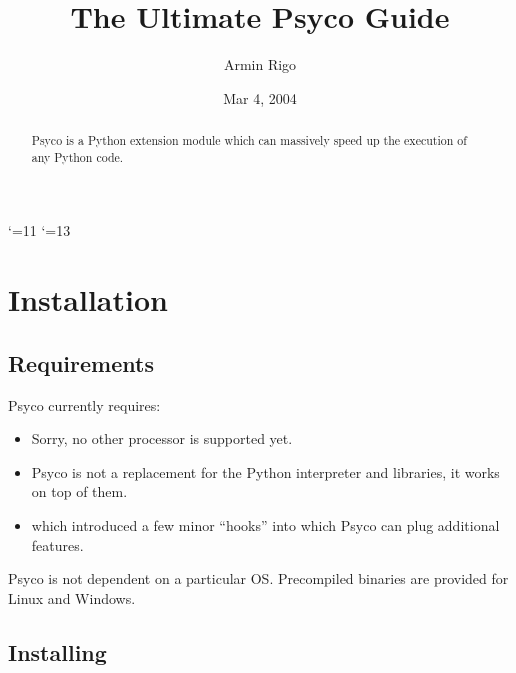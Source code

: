 \documentclass{manual}
\title{The Ultimate Psyco Guide}
\author{Armin Rigo}
\date{Mar 4, 2004}
\begin{document}
\catcode`\@=11
\renewcommand{\py@reset}{}
\catcode`\@=13

\maketitle


\begin{abstract}

\noindent
Psyco is a Python extension module which can massively speed up the execution of any Python code.


\end{abstract}

\tableofcontents


\chapter{Installation}

\section{Requirements}\label{req}

Psyco currently requires:

\begin{itemize}
  
\item {}  Sorry, no other processor is supported yet.
  
\item {}  Psyco is not a replacement for the Python interpreter and libraries, it works on top of them.
  
\item {} which introduced a few minor ``hooks'' into which Psyco can plug additional features.
  
\end{itemize}

Psyco is not dependent on a particular OS.  Precompiled binaries are provided for Linux and Windows.


\section{Installing}\label{binaries}
\end{document}
